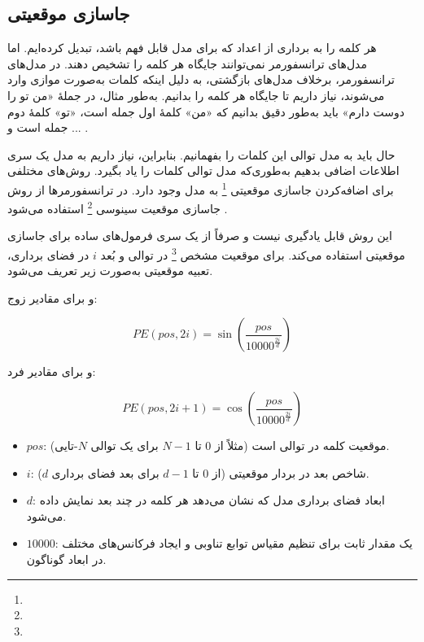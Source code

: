 \subsection{جاسازی موقعیتی}

هر کلمه را به برداری از اعداد که برای مدل قابل فهم باشد، تبدیل کرده‌ایم. اما مدل‌های ترانسفورمر نمی‌توانند جایگاه هر کلمه را تشخیص دهند. در مدل‌های ترانسفورمر، برخلاف مدل‌های بازگشتی، به دلیل اینکه کلمات به‌صورت موازی وارد می‌شوند، نیاز داریم تا جایگاه هر کلمه را بدانیم. به‌طور مثال، در جملهٔ «من تو را دوست دارم» باید به‌طور دقیق بدانیم که «من» کلمهٔ اول جمله است، «تو» کلمهٔ دوم جمله است و ... .

حال باید به مدل توالی این کلمات را بفهمانیم. بنابراین، نیاز داریم به مدل یک سری اطلاعات اضافی بدهیم به‌طوری‌که مدل توالی کلمات را یاد بگیرد. روش‌های مختلفی برای اضافه‌کردن جاسازی موقعیتی \footnote{} به مدل وجود دارد. در ترانسفورمرها از روش جاسازی موقعیت سینوسی
 \footnote{} استفاده می‌شود \cite{vaswani2017attention}.



این روش قابل یادگیری نیست و صرفاً از یک سری فرمول‌های ساده برای جاسازی موقعیتی استفاده می‌کند.  
برای موقعیت مشخص \footnote{} در توالی و بُعد \( i \) در فضای برداری، تعبیه موقعیتی به‌صورت زیر تعریف می‌شود.  

و برای مقادیر زوج:  

\begin{equation}
	PE(pos, 2i) = \sin\left( \frac{pos}{10000^{\frac{2i}{d}}} \right)
	\label{eq:pe_even}
\end{equation}

و برای مقادیر فرد:  

\begin{equation}
	PE(pos, 2i+1) = \cos\left( \frac{pos}{10000^{\frac{2i}{d}}} \right)
	\label{eq:pe_odd}
\end{equation}
	



\begin{itemize}
	\item \( pos \): موقعیت کلمه در توالی است (مثلاً از \( 0 \) تا \( N-1 \) برای یک توالی \( N \)-تایی).
	\item \( i \): شاخص بعد در بردار موقعیتی (از \( 0 \) تا \( d-1 \) برای بعد فضای برداری \( d \)).
	\item \( d \): ابعاد فضای برداری مدل که نشان می‌دهد هر کلمه در چند بعد نمایش داده می‌شود.
	\item \( 10000 \): یک مقدار ثابت برای تنظیم مقیاس توابع تناوبی و ایجاد فرکانس‌های مختلف در ابعاد گوناگون.
\end{itemize}  

